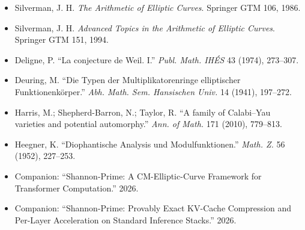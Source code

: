 \documentclass[
  11pt,
]{article}
\providecommand{\tightlist}{%
  \setlength{\itemsep}{0pt}\setlength{\parskip}{0pt}}
\begin{document}
\begin{itemize}
\tightlist
\item
  Silverman, J. H. \emph{The Arithmetic of Elliptic Curves}. Springer
  GTM 106, 1986.
\item
  Silverman, J. H. \emph{Advanced Topics in the Arithmetic of Elliptic
  Curves}. Springer GTM 151, 1994.
\item
  Deligne, P. ``La conjecture de Weil. I.'' \emph{Publ. Math. IHÉS} 43
  (1974), 273--307.
\item
  Deuring, M. ``Die Typen der Multiplikatorenringe elliptischer
  Funktionenkörper.'' \emph{Abh. Math. Sem. Hansischen Univ.} 14 (1941),
  197--272.
\item
  Harris, M.; Shepherd-Barron, N.; Taylor, R. ``A family of Calabi--Yau
  varieties and potential automorphy.'' \emph{Ann. of Math.} 171 (2010),
  779--813.
\item
  Heegner, K. ``Diophantische Analysis und Modulfunktionen.''
  \emph{Math. Z.} 56 (1952), 227--253.
\item
  Companion: ``Shannon-Prime: A CM-Elliptic-Curve Framework for
  Transformer Computation.'' 2026.
\item
  Companion: ``Shannon-Prime: Provably Exact KV-Cache Compression and
  Per-Layer Acceleration on Standard Inference Stacks.'' 2026.
\end{itemize}
\end{document}
